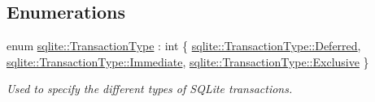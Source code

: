 \subsection*{Enumerations}
\begin{DoxyCompactItemize}
\item 
enum \hyperlink{a00038_aea994c2d3b1e9448cd9c526b44f78890}{sqlite\-::\-Transaction\-Type} \-: int \{ \hyperlink{a00038_aea994c2d3b1e9448cd9c526b44f78890a4ed71db54748b36eeb398876b0c747ac}{sqlite\-::\-Transaction\-Type\-::\-Deferred}, 
\hyperlink{a00038_aea994c2d3b1e9448cd9c526b44f78890a43f6615bbb2c40a5306ff804094420b1}{sqlite\-::\-Transaction\-Type\-::\-Immediate}, 
\hyperlink{a00038_aea994c2d3b1e9448cd9c526b44f78890a2ef50b4c466304dc6ac77bac8a779971}{sqlite\-::\-Transaction\-Type\-::\-Exclusive}
 \}
\begin{DoxyCompactList}\small\item\em Used to specify the different types of S\-Q\-Lite transactions. \end{DoxyCompactList}\end{DoxyCompactItemize}
